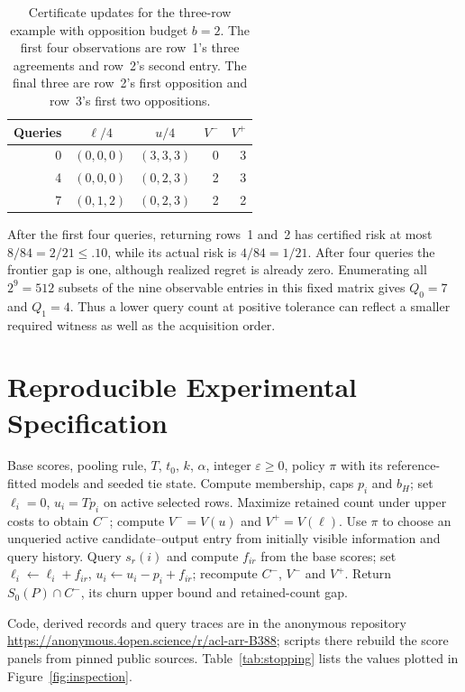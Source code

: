 \begin{table}[t]
\centering\small
\begin{tabular}{rccrr}
\toprule
Queries & $\ell/4$ & $u/4$ & $V^-$ & $V^+$\\
\midrule
0 & $(0,0,0)$ & $(3,3,3)$ & 0 & 3\\
4 & $(0,0,0)$ & $(0,2,3)$ & 2 & 3\\
7 & $(0,1,2)$ & $(0,2,3)$ & 2 & 2\\
\bottomrule
\end{tabular}
\caption{Certificate updates for the three-row example with opposition budget $b=2$. The first four observations are row~1's three agreements and row~2's second entry. The final three are row~2's first opposition and row~3's first two oppositions.}
\label{tab:worked-example}
\end{table}

After the first four queries, returning rows~1 and~2 has certified risk at most $8/84=2/21\le.10$, while its actual risk is $4/84=1/21$. After four queries the frontier gap is one, although realized regret is already zero. Enumerating all $2^9=512$ subsets of the nine observable entries in this fixed matrix gives $Q_0=7$ and $Q_1=4$. Thus a lower query count at positive tolerance can reflect a smaller required witness as well as the acquisition order.

\section{Reproducible Experimental Specification}
\label{app:protocol}
\begin{algorithm}[h]
\caption{Score inspection for certified retention}
\label{alg:inspect}
\begin{algorithmic}[1]
\REQUIRE Base scores, pooling rule, $T$, $t_0$, $k$, $\alpha$, integer $\varepsilon\ge0$, policy $\pi$ with its reference-fitted models and seeded tie state.
\STATE Compute membership, caps $p_i$ and $b_H$; set $\ell_i=0$, $u_i=Tp_i$ on active selected rows.
\STATE Maximize retained count under upper costs to obtain $C^-$; compute $V^-=V(u)$ and $V^+=V(\ell)$.
\STATE Use $\pi$ to choose an unqueried active candidate--output entry from initially visible information and query history.
\STATE Query $s_r(i)$ and compute $f_{ir}$ from the base scores; set $\ell_i\gets\ell_i+f_{ir}$, $u_i\gets u_i-p_i+f_{ir}$; recompute $C^-$, $V^-$ and $V^+$.
\ENDWHILE
\STATE Return $S_0(P)\cap C^-$, its churn upper bound and retained-count gap.
\end{algorithmic}
\end{algorithm}
Code, derived records and query traces are in the anonymous repository \url{https://anonymous.4open.science/r/acl-arr-B388}; scripts there rebuild the score panels from pinned public sources.
Table~\ref{tab:stopping} lists the values plotted in Figure~\ref{fig:inspection}.


